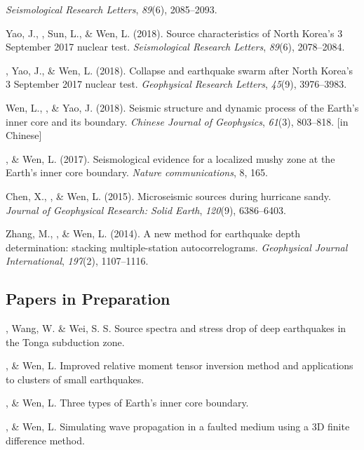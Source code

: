 \begin{etaremune}
    \textit{Seismological Research Letters}, \textit{89}(6), 2085--2093.
\item
    Yao, J., \Tian\CF, Sun, L., \& Wen, L. (2018).
	Source characteristics of North Korea's 3 September 2017 nuclear test.
    \textit{Seismological Research Letters}, \textit{89}(6), 2078--2084.
\item
    \Tian, Yao, J., \& Wen, L. (2018).
    Collapse and earthquake swarm after North Korea's 3 September 2017 nuclear test.
    \textit{Geophysical Research Letters}, \textit{45}(9), 3976--3983.
\item
    Wen, L., \Tian, \& Yao, J. (2018).
    Seismic structure and dynamic process of the Earth's inner core and its boundary.
    \textit{Chinese Journal of Geophysics}, \textit{61}(3), 803--818.
     [in Chinese]
\item
    \Tian, \& Wen, L. (2017).
    Seismological evidence for a localized mushy zone at the Earth's inner core boundary.
    \textit{Nature communications}, 8, 165.
\item
    Chen, X., \Tian, \& Wen, L. (2015).
    Microseismic sources during hurricane sandy.
    \textit{Journal of Geophysical Research: Solid Earth}, \textit{120}(9), 6386--6403.
\item Zhang, M., \Tian, \& Wen, L. (2014).
    A new method for earthquake depth determination: stacking multiple-station autocorrelograms.
    \textit{Geophysical Journal International}, \textit{197}(2), 1107--1116.
\end{etaremune}



\subsection*{Papers in Preparation}
\begin{etaremune}
\item \Tian, Wang, W. \& Wei, S. S.
	Source spectra and stress drop of deep earthquakes in the Tonga subduction zone.
\item
    \Tian, \& Wen, L.
    Improved relative moment tensor inversion method and applications to clusters of small earthquakes.
\item
    \Tian, \& Wen, L.
    Three types of Earth's inner core boundary.
\item
    \Tian, \& Wen, L.
    Simulating wave propagation in a faulted medium using a 3D finite difference method.
\end{etaremune}
